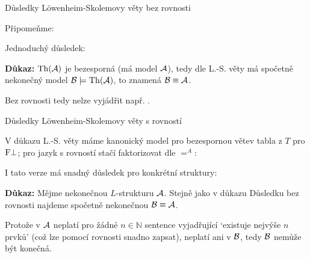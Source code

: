 \documentclass{beamer}
\begin{document}
\begin{frame}{Důsledky Löwenheim-Skolemovy věty bez rovnosti}

    Připomeňme:

    \smallskip


    \medskip

    Jednoduchý důsledek:

    \smallskip


    \textbf{Důkaz:} $\operatorname{Th}(\mathcal{A})$ je bezesporná (má model $\mathcal{A}$), tedy dle L.-S. věty má spočetně nekonečný model $\mathcal{B}\models\operatorname{Th}(\mathcal{A})$, to znamená $\mathcal{B}\equiv\mathcal{A}$.\hfill\qedsymbol

    \medskip

    Bez rovnosti tedy nelze vyjádřit např. .

\end{frame}


\begin{frame}{Důsledky Löwenheim-Skolemovy věty s rovností}

    V důkazu L.-S. věty máme kanonický model pro bezespornou větev tabla z $T$ pro $\mathrm{F}\bot$; pro jazyk s rovností stačí faktorizovat dle $=^A$:

    \smallskip


    \medskip

    I tato verze má snadný důsledek pro konkrétní struktury:

    \smallskip


    \smallskip

    \textbf{Důkaz:}
    Mějme nekonečnou $L$-strukturu $\mathcal{A}$. Stejně jako v důkazu Důsledku bez rovnosti najdeme spočetně nekonečnou $\mathcal{B}\equiv\mathcal{A}$. 
    
    Protože v $\mathcal{A}$ neplatí pro žádné $n\in\mathbb N$ sentence vyjadřující `existuje nejvýše $n$ prvků' (což lze pomocí rovnosti snadno zapsat), neplatí ani v $\mathcal{B}$, tedy $\mathcal{B}$ nemůže být konečná.\hfill\qedsymbol

\end{frame}
\end{document}
